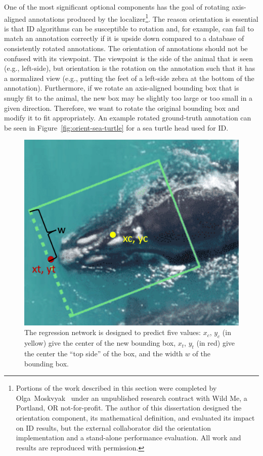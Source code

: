 One of the most significant optional components has the goal of rotating axis-aligned annotations produced by the localizer\footnote{Portions of the work described in this section were completed by Olga Moskvyak~\cite{moskvyak_robust_2019} under an unpublished research contract with Wild Me, a Portland, OR not-for-profit.  The author of this dissertation designed the orientation component, its mathematical definition, and evaluated its impact on ID results, but the external collaborator did the orientation implementation and a stand-alone performance evaluation.  All work and results are reproduced with permission.}.  The reason orientation is essential is that ID algorithms can be susceptible to rotation and, for example, can fail to match an annotation correctly if it is upside down compared to a database of consistently rotated annotations.  The orientation of annotations should not be confused with its viewpoint.  The viewpoint is the side of the animal that is seen (e.g., left-side), but orientation is the rotation on the annotation such that it has a normalized view (e.g., putting the feet of a left-side zebra at the bottom of the annotation).  Furthermore, if we rotate an axis-aligned bounding box that is snugly fit to the animal, the new box may be slightly too large or too small in a given direction. Therefore, we want to rotate the original bounding box and modify it to fit appropriately.  An example rotated ground-truth annotation can be seen in Figure~\ref{fig:orient-sea-turtle} for a sea turtle head used for ID.

\begin{figure}[!t]
    \begin{center}
        \includegraphics[width=0.75\linewidth]{resources/orient-spec.pdf}
    \end{center}
    \caption{The regression network is designed to predict five values: $x_c$, $y_c$ (in yellow) give the center of the new bounding box, $x_t$, $y_t$ (in red) give the center the ``top side'' of the box, and the width $w$ of the bounding box.}
    \label{fig:orient-spec}
\end{figure}

